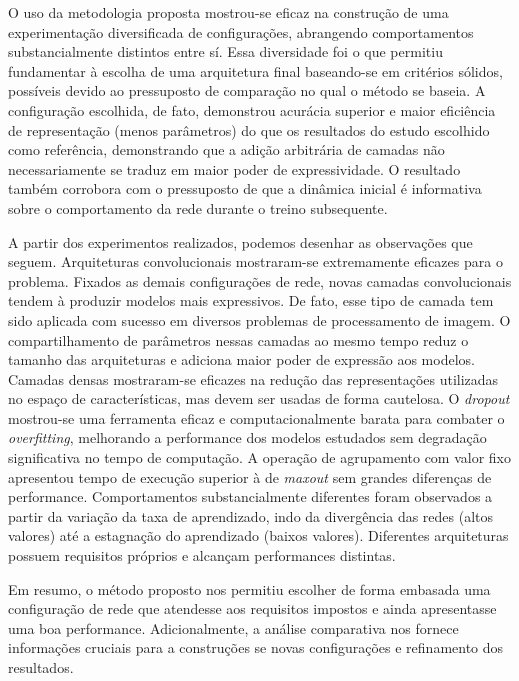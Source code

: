 O uso da metodologia proposta mostrou-se eficaz na construção de uma experimentação diversificada de configurações, abrangendo comportamentos substancialmente distintos entre sí. Essa diversidade foi o que permitiu fundamentar à escolha de uma arquitetura final baseando-se em critérios sólidos, possíveis devido ao pressuposto de comparação no qual o método se baseia. A configuração escolhida, de fato, demonstrou acurácia superior e maior eficiência de representação (menos parâmetros) do que os resultados do estudo escolhido como referência, demonstrando que a adição arbitrária de camadas não necessariamente se traduz em maior poder de expressividade. O resultado também corrobora com o pressuposto de que a dinâmica inicial é informativa sobre o comportamento da rede durante o treino subsequente.

A partir dos experimentos realizados, podemos desenhar as observações que seguem. Arquiteturas convolucionais mostraram-se extremamente eficazes para o problema. Fixados as demais configurações de rede, novas camadas convolucionais tendem à produzir modelos mais expressivos. De fato, esse tipo de camada tem sido aplicada com sucesso em diversos problemas de processamento de imagem. O compartilhamento de parâmetros nessas camadas ao mesmo tempo reduz o tamanho das arquiteturas e adiciona maior poder de expressão aos modelos. Camadas densas mostraram-se eficazes na redução das representações utilizadas no espaço de características, mas devem ser usadas de forma cautelosa. O \textit{dropout} mostrou-se uma ferramenta eficaz e computacionalmente barata para combater o \textit{overfitting}, melhorando a performance dos modelos estudados sem degradação significativa no tempo de computação. A operação de agrupamento com valor fixo apresentou tempo de execução superior à de \textit{maxout} sem grandes diferenças de performance. Comportamentos substancialmente diferentes foram observados a partir da variação da taxa de aprendizado, indo da divergência das redes (altos valores) até a estagnação do aprendizado (baixos valores). Diferentes arquiteturas possuem requisitos próprios e alcançam performances distintas.

Em resumo, o método proposto nos permitiu escolher de forma embasada uma configuração de rede que atendesse aos requisitos impostos e ainda apresentasse uma boa performance. Adicionalmente, a análise comparativa nos fornece informações cruciais para a construções se novas configurações e refinamento dos resultados.  